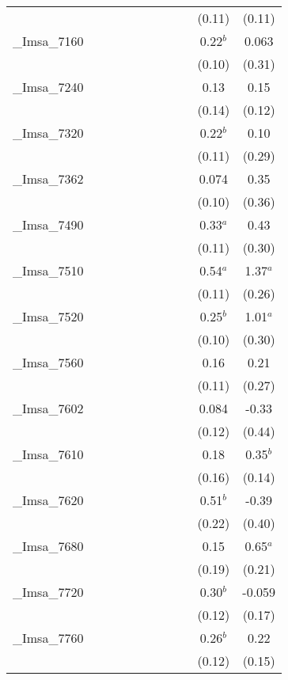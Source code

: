 \documentclass[]{article}
\begin{document}
\begin{tabular}{lcccccccccc}
 &  &  &  &  &  &  &  &  & (0.11) & (0.11) \\
\_Imsa\_7160 &  &  &  &  &  &  &  &  & 0.22$^b$ & 0.063 \\
 &  &  &  &  &  &  &  &  & (0.10) & (0.31) \\
\_Imsa\_7240 &  &  &  &  &  &  &  &  & 0.13 & 0.15 \\
 &  &  &  &  &  &  &  &  & (0.14) & (0.12) \\
\_Imsa\_7320 &  &  &  &  &  &  &  &  & 0.22$^b$ & 0.10 \\
 &  &  &  &  &  &  &  &  & (0.11) & (0.29) \\
\_Imsa\_7362 &  &  &  &  &  &  &  &  & 0.074 & 0.35 \\
 &  &  &  &  &  &  &  &  & (0.10) & (0.36) \\
\_Imsa\_7490 &  &  &  &  &  &  &  &  & 0.33$^a$ & 0.43 \\
 &  &  &  &  &  &  &  &  & (0.11) & (0.30) \\
\_Imsa\_7510 &  &  &  &  &  &  &  &  & 0.54$^a$ & 1.37$^a$ \\
 &  &  &  &  &  &  &  &  & (0.11) & (0.26) \\
\_Imsa\_7520 &  &  &  &  &  &  &  &  & 0.25$^b$ & 1.01$^a$ \\
 &  &  &  &  &  &  &  &  & (0.10) & (0.30) \\
\_Imsa\_7560 &  &  &  &  &  &  &  &  & 0.16 & 0.21 \\
 &  &  &  &  &  &  &  &  & (0.11) & (0.27) \\
\_Imsa\_7602 &  &  &  &  &  &  &  &  & 0.084 & -0.33 \\
 &  &  &  &  &  &  &  &  & (0.12) & (0.44) \\
\_Imsa\_7610 &  &  &  &  &  &  &  &  & 0.18 & 0.35$^b$ \\
 &  &  &  &  &  &  &  &  & (0.16) & (0.14) \\
\_Imsa\_7620 &  &  &  &  &  &  &  &  & 0.51$^b$ & -0.39 \\
 &  &  &  &  &  &  &  &  & (0.22) & (0.40) \\
\_Imsa\_7680 &  &  &  &  &  &  &  &  & 0.15 & 0.65$^a$ \\
 &  &  &  &  &  &  &  &  & (0.19) & (0.21) \\
\_Imsa\_7720 &  &  &  &  &  &  &  &  & 0.30$^b$ & -0.059 \\
 &  &  &  &  &  &  &  &  & (0.12) & (0.17) \\
\_Imsa\_7760 &  &  &  &  &  &  &  &  & 0.26$^b$ & 0.22 \\
 &  &  &  &  &  &  &  &  & (0.12) & (0.15) \\

\end{tabular}
\end{document}
